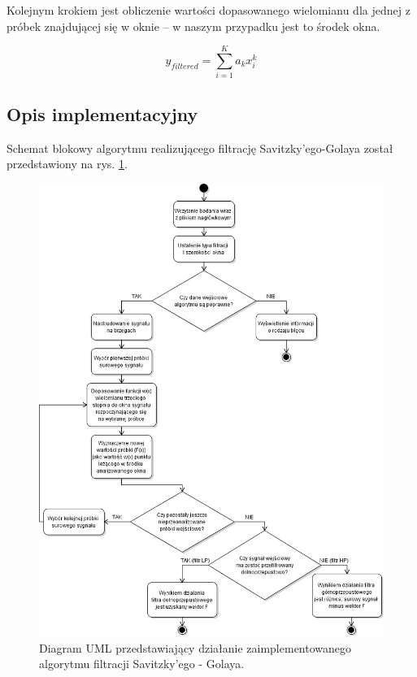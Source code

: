 \documentclass[a4paper]{article}
\begin{document}
Kolejnym krokiem jest obliczenie wartości dopasowanego wielomianu dla jednej z próbek znajdującej się w oknie -- w naszym przypadku jest to środek okna.


\begin{equation}
y_{filtered} = \sum_{i=1}^K a_k x_i^k
\end{equation}




\subsection {Opis implementacyjny}

Schemat blokowy algorytmu realizującego filtrację Savitzky'ego-Golaya został przedstawiony na rys. \ref{uml}. 

\begin{figure}[H]
\centering
\includegraphics[width=1\textwidth]{algorytm_uml.png}
\caption{\label{uml} Diagram UML przedstawiający działanie zaimplementowanego algorytmu filtracji Savitzky'ego - Golaya.}
\end{figure}
\end{document}
